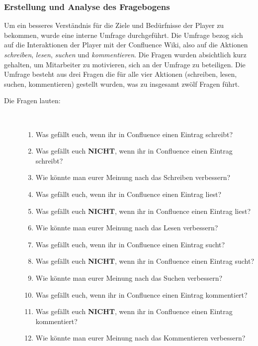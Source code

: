 \documentclass[a4paper,12pt,twoside]{scrartcl}
\begin{document}
\subsubsection{Erstellung und Analyse des Fragebogens}
\label{Fragebogen}
Um ein besseres Verständnis für die Ziele und Bedürfnisse der Player zu bekommen, wurde eine interne Umfrage durchgeführt. Die Umfrage bezog sich auf die Interaktionen der Player mit der Confluence Wiki, also auf die Aktionen \textit{schreiben}, \textit{lesen}, \textit{suchen} und \textit{kommentieren}. Die Fragen wurden absichtlich kurz gehalten, um Mitarbeiter zu motivieren, sich an der Umfrage zu beteiligen. Die Umfrage besteht aus drei Fragen die für alle vier Aktionen (schreiben, lesen, suchen, kommentieren) gestellt wurden, was zu insgesamt zwölf Fragen führt.
\begin{description}
   \item[Die Fragen lauten:]~\par
   \begin{enumerate}
      \item Was gefällt euch, wenn ihr in Confluence einen Eintrag schreibt?
      \item Was gefällt euch \textbf{NICHT}, wenn ihr in Confluence einen Eintrag schreibt?
      \item Wie könnte man eurer Meinung nach das Schreiben verbessern?
      
      \item Was gefällt euch, wenn ihr in Confluence einen Eintrag liest?
      \item Was gefällt euch \textbf{NICHT}, wenn ihr in Confluence einen Eintrag liest?
      \item Wie könnte man eurer Meinung nach das Lesen verbessern?
      
      \item Was gefällt euch, wenn ihr in Confluence einen Eintrag sucht?
      \item Was gefällt euch \textbf{NICHT}, wenn ihr in Confluence einen Eintrag sucht?
      \item Wie könnte man eurer Meinung nach das Suchen verbessern?
      
      \item Was gefällt euch, wenn ihr in Confluence einen Eintrag kommentiert?
      \item Was gefällt euch \textbf{NICHT}, wenn ihr in Confluence einen Eintrag kommentiert?
      \item Wie könnte man eurer Meinung nach das Kommentieren verbessern?
   \end{enumerate}
\end{description}
\end{document}
